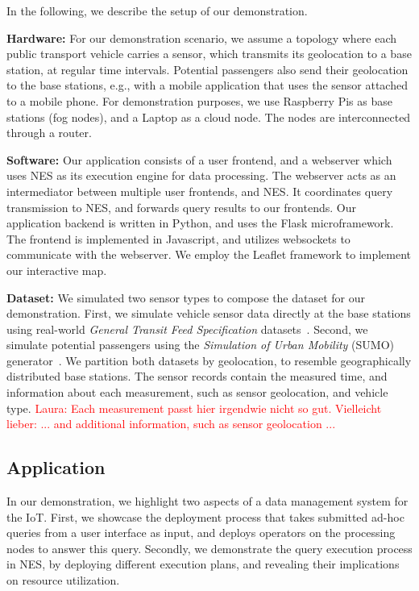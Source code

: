 In the following, we describe the setup of our demonstration.

\textbf{Hardware:} For our demonstration scenario, we assume a topology where each public transport vehicle carries a sensor, which transmits its geolocation to a base station, at regular time intervals. Potential passengers also send their geolocation to the base stations, e.g., with a mobile application that uses the sensor attached to a mobile phone. 
For demonstration purposes, we use Raspberry Pis as base stations (fog nodes), and a Laptop as a cloud node. The nodes are interconnected through a router.

\textbf{Software:} Our application consists of a user frontend, and a webserver which uses NES as its execution engine for data processing. The webserver acts as an intermediator between multiple user frontends, and NES. It coordinates query transmission to NES, and forwards query results to our frontends.
Our application backend is written in Python, and uses the Flask microframework. The frontend is implemented in Javascript, and utilizes websockets to communicate with the webserver. We employ the Leaflet framework to implement our interactive map.

\textbf{Dataset:} We simulated two sensor types to compose the dataset for our demonstration.
First, we simulate vehicle sensor data directly at the base stations using real-world \textit{General Transit Feed Specification} datasets~\cite{gtfs}.
Second, we simulate potential passengers using the \textit{Simulation of Urban Mobility} (SUMO) generator~\cite{sumo}. 
We partition both datasets by geolocation, to resemble geographically distributed base stations.
The sensor records contain the measured time, and information about each measurement, such as sensor geolocation, and vehicle type. \textcolor{red}{Laura: Each measurement passt hier irgendwie nicht so gut. Vielleicht lieber: ... and additional information, such as sensor geolocation ...}

\subsection{Application}
\label{section:application}
In our demonstration, we highlight two aspects of a data management system for the IoT.
First, we showcase the deployment process that takes submitted ad-hoc queries from a user interface as input, and deploys operators on the processing nodes to answer this query.
Secondly, we demonstrate the query execution process in NES, by deploying different execution plans, and revealing their implications on resource utilization.

